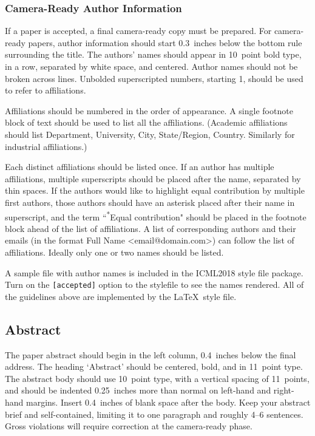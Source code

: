 \documentclass{article}
\begin{document}
\subsubsection{Camera-Ready Author Information}
\label{final author}

If a paper is accepted, a final camera-ready copy must be prepared.
%
For camera-ready papers, author information should start 0.3~inches below the
bottom rule surrounding the title. The authors' names should appear in 10~point
bold type, in a row, separated by white space, and centered. Author names should
not be broken across lines. Unbolded superscripted numbers, starting 1, should
be used to refer to affiliations.

Affiliations should be numbered in the order of appearance. A single footnote
block of text should be used to list all the affiliations. (Academic
affiliations should list Department, University, City, State/Region, Country.
Similarly for industrial affiliations.)

Each distinct affiliations should be listed once. If an author has multiple
affiliations, multiple superscripts should be placed after the name, separated
by thin spaces. If the authors would like to highlight equal contribution by
multiple first authors, those authors should have an asterisk placed after their
name in superscript, and the term ``\textsuperscript{*}Equal contribution"
should be placed in the footnote block ahead of the list of affiliations. A
list of corresponding authors and their emails (in the format Full Name
\textless{}email@domain.com\textgreater{}) can follow the list of affiliations.
Ideally only one or two names should be listed.

A sample file with author names is included in the ICML2018 style file
package. Turn on the \texttt{[accepted]} option to the stylefile to
see the names rendered. All of the guidelines above are implemented
by the \LaTeX\ style file.

\subsection{Abstract}

The paper abstract should begin in the left column, 0.4~inches below the final
address. The heading `Abstract' should be centered, bold, and in 11~point type.
The abstract body should use 10~point type, with a vertical spacing of
11~points, and should be indented 0.25~inches more than normal on left-hand and
right-hand margins. Insert 0.4~inches of blank space after the body. Keep your
abstract brief and self-contained, limiting it to one paragraph and roughly 4--6
sentences. Gross violations will require correction at the camera-ready phase.
\end{document}
